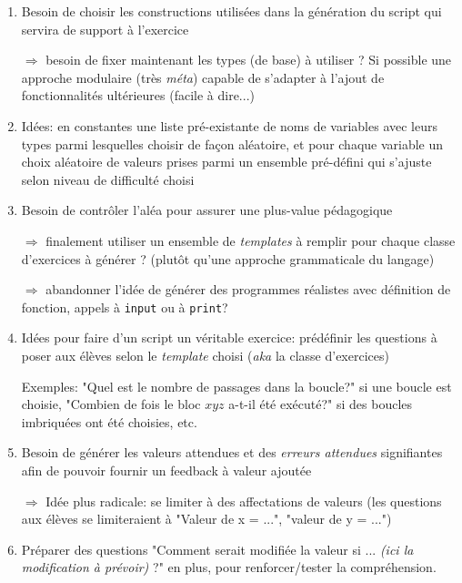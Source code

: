 \documentclass[11pt,a4paper]{article}
\begin{document}
\begin{enumerate}
    
    \item Besoin de choisir les constructions utilisées dans la génération du script qui servira de support à l'exercice \par $\Rightarrow$ besoin de fixer maintenant les types (de base) à utiliser ? Si possible une approche modulaire (très \textit{méta}) capable de s'adapter à l'ajout de fonctionnalités ultérieures (facile à dire...)

    \item Idées: en constantes une liste pré-existante de noms de variables avec leurs types parmi lesquelles choisir de façon aléatoire, et pour chaque variable un choix aléatoire de valeurs prises parmi un ensemble pré-défini qui s'ajuste selon niveau de difficulté choisi

    \item Besoin de contrôler l'aléa pour assurer une plus-value pédagogique \par $\Rightarrow$ finalement utiliser un ensemble de \textit{templates} à remplir pour chaque classe d'exercices à générer ? (plutôt qu'une approche grammaticale du langage) \par $\Rightarrow$ abandonner l'idée de générer des programmes réalistes avec définition de fonction, appels à \texttt{input} ou à \texttt{print}?
    
    \item Idées pour faire d'un script un véritable exercice: prédéfinir les questions à poser aux élèves selon le \textit{template} choisi (\textit{aka} la classe d'exercices)\par Exemples: "Quel est le nombre de passages dans la boucle?" si une boucle est choisie, "Combien de fois le bloc $xyz$ a-t-il été exécuté?" si des boucles imbriquées ont été choisies, etc. 
    
    \item Besoin de générer les valeurs attendues et des \textit{erreurs attendues} signifiantes afin de pouvoir fournir un feedback à valeur ajoutée  \par $\Rightarrow$ Idée plus radicale: se limiter à des affectations de valeurs (les questions aux élèves se limiteraient à "Valeur de x = ...", "valeur de y = ...")

    \item Préparer des questions "Comment serait modifiée la valeur si ... \textit{(ici la modification à prévoir)} ?" en plus, pour renforcer/tester la compréhension.
    

\end{enumerate}
\end{document}
